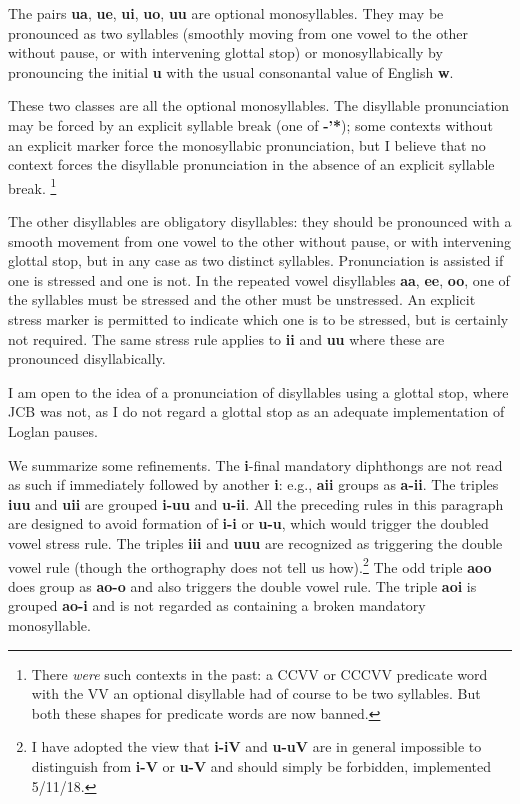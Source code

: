 \documentclass[12pt]{book}
\begin{document}
The pairs {\bf ua}, {\bf ue}, {\bf ui}, {\bf uo}, {\bf uu} are optional monosyllables.  They may be pronounced as two syllables (smoothly moving from one vowel to the other without pause, or with intervening glottal stop)
or monosyllabically by pronouncing the initial {\bf u} with the usual consonantal value of English {\bf w}.

These two classes are all the optional monosyllables.  The disyllable pronunciation may be forced by an explicit syllable break (one of {\bf -'*}); some contexts without an explicit marker force the monosyllabic pronunciation, but I believe that no context forces the disyllable pronunciation in the absence of an explicit syllable break.  \footnote{There {\em were\/} such contexts in the past:  a CCVV or CCCVV predicate word with the VV an optional disyllable had of course to be two syllables.  But both these shapes for predicate words are now banned.}


The other disyllables are obligatory disyllables:  they should be pronounced with a smooth movement from one vowel to the other without pause, or with intervening glottal stop, but in any case as two distinct syllables.   Pronunciation is assisted if one is stressed and one is not.   In the repeated vowel disyllables {\bf aa}, {\bf ee}, {\bf oo}, one of the syllables must be stressed and the other must be unstressed.  An explicit stress marker is permitted to indicate which one is to be stressed, but is certainly not required.  The same stress rule applies to {\bf ii} and {\bf uu} where these are pronounced disyllabically.  

I am open to the idea of a pronunciation of disyllables using a glottal stop, where JCB was not, as I do not regard a glottal stop as an adequate implementation of Loglan pauses.

We summarize some refinements.  The {\bf i}-final mandatory diphthongs are not read as such if immediately followed by another {\bf i}:  e.g.,
{\bf aii} groups as {\bf a-ii}.  The triples {\bf iuu} and {\bf uii} are grouped {\bf i-uu} and {\bf u-ii}.   All the preceding rules in this paragraph are designed to avoid formation of {\bf i-i} or {\bf u-u}, which would trigger the doubled vowel stress rule. The triples {\bf iii} and {\bf uuu} are recognized
as triggering the double vowel rule (though the orthography does not tell us how).\footnote{I have adopted the view that {\bf i-iV} and {\bf u-uV} are in general impossible to distinguish from  {\bf i-V} or {\bf u-V} and should simply be forbidden, implemented 5/11/18.}   The odd triple {\bf aoo} does group as {\bf ao-o} and also 
triggers the double vowel rule.  The triple {\bf aoi} is grouped {\bf ao-i} and is not regarded as containing a broken mandatory monosyllable.
\end{document}
